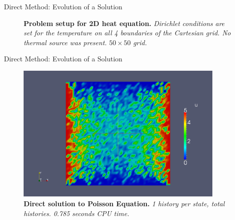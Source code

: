 \documentclass{beamer}
\begin{document}
\begin{frame}{Direct Method: Evolution of a Solution}

  \begin{figure}[h!]
    \begin{center}
      \scalebox{1.0}{  }
    \end{center}
  \caption{\textbf{Problem setup for 2D heat equation.}
    \textit{Dirichlet conditions are set for the temperature on all 4
      boundaries of the Cartesian grid. No thermal source was
      present. $50 \times 50$ grid.}}
  \end{figure}

\end{frame}

\begin{frame}{Direct Method: Evolution of a Solution}

  \begin{figure}[h!]
    \begin{center}
      \includegraphics[width=4in]{direct_1.png}
    \end{center}
    \caption{\textbf{Direct solution to Poisson Equation.} \textit{1
        history per state,  total histories. 0.785 seconds
        CPU time.} }
  \end{figure}

\end{frame}
\end{document}
